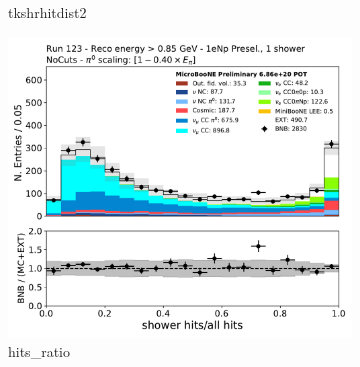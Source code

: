 \begin{figure}[H]
\begin{subfigure}{0.3\textwidth}
    \caption{tkshrhitdist2}
    \end{subfigure}
    \begin{subfigure}{0.3\textwidth}
    \includegraphics[width=1.0\textwidth]{Sidebands/Figures/1eNp/HighEnergy/HiEext_NPOneShr_None_pi0e040/hits_ratio.pdf}
    \caption{hits\_ratio}
    \end{subfigure}
    \caption{} 
    \label{fig:HE_1eNp_3}
\end{figure}

